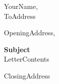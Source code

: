 \documentclass[11pt,a4paper]{letter}
\begin{document}
 
\begin{letter}{YourName,\\ToAddress} 
\opening{OpeningAddress,} 

\textbf{Subject}\\
 
LetterContents \\[1cm]


 
\closing{ClosingAddress} 
\end{letter} 
\end{document}
